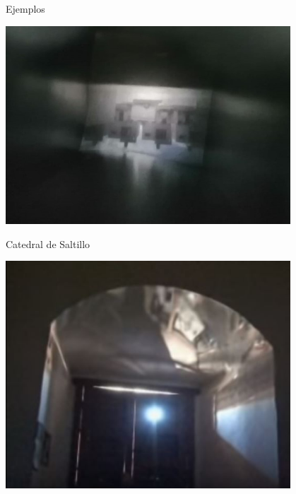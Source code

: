 \documentclass{if-beamer}
\begin{document}
\begin{frame}{Ejemplos}
\begin{center}
    \includegraphics[width=0.8\textwidth]{camara_diy.jpeg}
\end{center}
\end{frame}

\begin{frame}{Catedral de Saltillo}

\begin{center}
    \includegraphics[width=0.8\textwidth]{catedral.JPG}
\end{center}
\end{frame}

\end{document}
